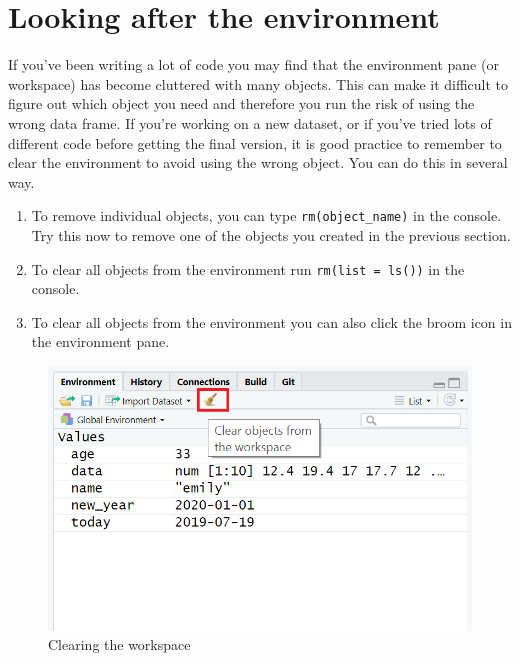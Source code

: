 \documentclass[]{book}
\providecommand{\tightlist}{%
  \setlength{\itemsep}{0pt}\setlength{\parskip}{0pt}}
\begin{document}
\hypertarget{looking-after-the-environment}{%
\section{Looking after the environment}\label{looking-after-the-environment}}

If you've been writing a lot of code you may find that the environment pane (or workspace) has become cluttered with many objects. This can make it difficult to figure out which object you need and therefore you run the risk of using the wrong data frame. If you're working on a new dataset, or if you've tried lots of different code before getting the final version, it is good practice to remember to clear the environment to avoid using the wrong object. You can do this in several way.

\begin{enumerate}
\def\labelenumi{\arabic{enumi}.}
\tightlist
\item
  To remove individual objects, you can type \texttt{rm(object\_name)} in the console. Try this now to remove one of the objects you created in the previous section.
\item
  To clear all objects from the environment run \texttt{rm(list\ =\ ls())} in the console.
\item
  To clear all objects from the environment you can also click the broom icon in the environment pane.
\end{enumerate}

\begin{figure}

{\centering \includegraphics[width=1\linewidth]{images/broom} 

}

\caption{Clearing the workspace}\label{fig:img-broom}
\end{figure}
\end{document}
